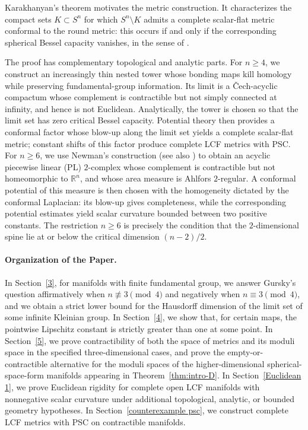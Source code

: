 \documentclass[12pt,oneside,a4paper]{article}
\theoremstyle{mytheorem}
\theoremstyle{remark}
\theoremstyle{definition}
\begin{document}
Karakhanyan's theorem \cite[Theorem~1.1]{zbMATH07873599} motivates the
metric construction.  It characterizes the compact sets $K\subset S^n$
for which $S^n\setminus K$ admits a complete scalar-flat metric conformal
to the round metric: this occurs if and only if the corresponding
spherical Bessel capacity vanishes, in the sense of
\cite[Section~2.2]{zbMATH07873599}.

 The proof has complementary topological and analytic parts.  For $n\geq 4$,
we construct an increasingly thin nested tower whose bonding maps kill
homology while preserving fundamental-group information.  Its limit is a
\v{C}ech-acyclic compactum whose complement is contractible but not simply
connected at infinity, and hence is not Euclidean.  Analytically, the tower
is chosen so that the limit set has zero critical Bessel capacity.
Potential theory then provides a conformal factor whose blow-up along the
limit set yields a complete scalar-flat metric; constant shifts of this
factor produce complete LCF metrics with PSC.  For $n\geq 6$, we use
Newman's construction \cite{zbMATH03054974} (see also
\cite[Example~3.2.2]{zbMATH07206284}) to obtain an acyclic piecewise
linear (PL) $2$-complex whose
complement is contractible but not homeomorphic to $\mathbb{R}^n$,
and whose area measure is Ahlfors $2$-regular.  A conformal potential of
this measure is then chosen with the homogeneity dictated by the
conformal Laplacian: its blow-up gives completeness, while the
corresponding potential estimates yield scalar curvature bounded
between two positive constants.  The restriction $n\ge6$ is precisely
the condition that the $2$-dimensional spine lie at or below the
critical dimension $(n-2)/2$.
 
 







\paragraph*{Organization of the Paper.}  In Section~\ref{3}, for manifolds with finite fundamental group, we answer Gursky's question affirmatively when \(n\not\equiv3\pmod4\) and negatively when \(n\equiv3\pmod4\), and we obtain a strict lower bound for the Hausdorff dimension of the limit set of some infinite Kleinian group. In Section~\ref{4}, we show that, for certain maps, the pointwise Lipschitz constant is strictly greater than one at some point. In Section~\ref{5}, we prove contractibility of both the space of metrics and its moduli space in the specified three-dimensional cases, and prove the empty-or-contractible alternative for the moduli spaces of the higher-dimensional spherical-space-form manifolds appearing in Theorem~\ref{thm:intro-D}. In Section~\ref{Euclidean 1}, we prove Euclidean rigidity for complete open LCF manifolds with nonnegative scalar curvature under additional topological, analytic, or bounded geometry hypotheses. In Section~\ref{counterexample psc}, we construct complete LCF metrics with PSC on contractible manifolds.
\end{document}
